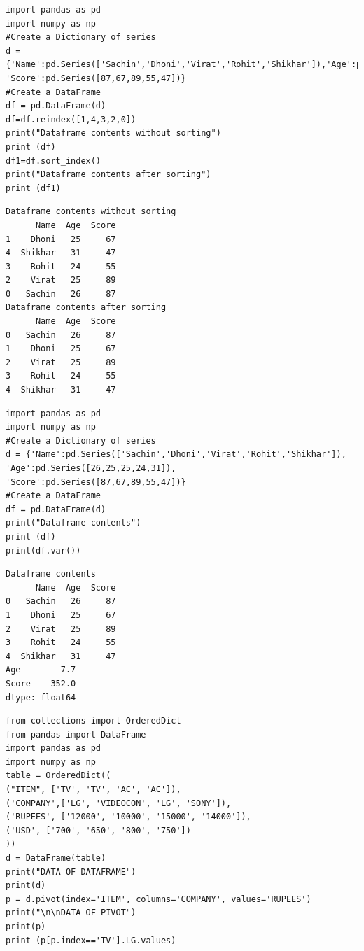 \documentclass[11pt]{article}
\begin{document}
\begin{verbatim}
import pandas as pd
import numpy as np
#Create a Dictionary of series
d = {'Name':pd.Series(['Sachin','Dhoni','Virat','Rohit','Shikhar']),'Age':pd.Series([26,25,25,24,31]), 'Score':pd.Series([87,67,89,55,47])}
#Create a DataFrame
df = pd.DataFrame(d)
df=df.reindex([1,4,3,2,0])
print("Dataframe contents without sorting")
print (df)
df1=df.sort_index()
print("Dataframe contents after sorting")
print (df1)
\end{verbatim}

\begin{verbatim}
Dataframe contents without sorting
      Name  Age  Score
1    Dhoni   25     67
4  Shikhar   31     47
3    Rohit   24     55
2    Virat   25     89
0   Sachin   26     87
Dataframe contents after sorting
      Name  Age  Score
0   Sachin   26     87
1    Dhoni   25     67
2    Virat   25     89
3    Rohit   24     55
4  Shikhar   31     47
\end{verbatim}

\begin{verbatim}
import pandas as pd
import numpy as np
#Create a Dictionary of series
d = {'Name':pd.Series(['Sachin','Dhoni','Virat','Rohit','Shikhar']),
'Age':pd.Series([26,25,25,24,31]),
'Score':pd.Series([87,67,89,55,47])}
#Create a DataFrame
df = pd.DataFrame(d)
print("Dataframe contents")
print (df)
print(df.var())
\end{verbatim}

\begin{verbatim}
Dataframe contents
      Name  Age  Score
0   Sachin   26     87
1    Dhoni   25     67
2    Virat   25     89
3    Rohit   24     55
4  Shikhar   31     47
Age        7.7
Score    352.0
dtype: float64
\end{verbatim}

\begin{verbatim}
from collections import OrderedDict
from pandas import DataFrame
import pandas as pd
import numpy as np
table = OrderedDict((
("ITEM", ['TV', 'TV', 'AC', 'AC']),
('COMPANY',['LG', 'VIDEOCON', 'LG', 'SONY']),
('RUPEES', ['12000', '10000', '15000', '14000']),
('USD', ['700', '650', '800', '750'])
))
d = DataFrame(table)
print("DATA OF DATAFRAME")
print(d)
p = d.pivot(index='ITEM', columns='COMPANY', values='RUPEES')
print("\n\nDATA OF PIVOT")
print(p)
print (p[p.index=='TV'].LG.values)
\end{verbatim}
\end{document}
